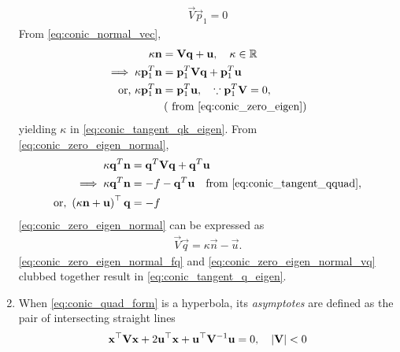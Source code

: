 \documentclass[journal,12pt,twocolumn]{IEEEtran}
\renewcommand\thesection{\arabic{section}}
\renewcommand\thesubsection{\thesection.\arabic{subsection}}
\begin{document}
\begin{enumerate}[label=\thesubsection.\arabic*.,ref=\thesubsection.\theenumi]
\begin{align}
\vec{V}\vec{p}_1 = 0
\label{eq:conic_zero_eigen}
\end{align}
From \eqref{eq:conic_normal_vec},
\begin{align}
\label{eq:conic_zero_eigen_normal}
\kappa \mathbf{n} &= \mathbf{V} \mathbf{q}+\mathbf{u}, \quad \kappa \in \mathbb{R}
\\
\implies \kappa \mathbf{p}_1^T\mathbf{n} &= \mathbf{p}_1^T\mathbf{V} \mathbf{q}+\mathbf{p}_1^T\mathbf{u}
\\
\text{or, } \kappa \mathbf{p}_1^T\mathbf{n} &= \mathbf{p}_1^T\mathbf{u},  \quad \because \mathbf{p}_1^T \mathbf{V} = 0, 
\\
	&\left(\text{ from } \eqref{eq:conic_zero_eigen}\right)
\end{align}
yielding $\kappa$ in \eqref{eq:conic_tangent_qk_eigen}. From \eqref{eq:conic_zero_eigen_normal},
\begin{align}
\kappa \mathbf{q}^T\mathbf{n} &= \mathbf{q}^T\mathbf{V} \mathbf{q}+\mathbf{q}^T\mathbf{u}
\\
\implies \kappa \mathbf{q}^T\mathbf{n} &= -f-\mathbf{q}^T\mathbf{u} \quad \text{from } \eqref{eq:conic_tangent_qquad},
\\
	\text{or, } \left(\kappa \mathbf{n}+\mathbf{u}\right)^{\top}\mathbf{q} &= -f
\label{eq:conic_zero_eigen_normal_fq}
\end{align}
\eqref{eq:conic_zero_eigen_normal} can be expressed as
\begin{align}
\label{eq:conic_zero_eigen_normal_vq}
\vec{V} \vec{q} = \kappa \vec{n} - \vec{u}.
\end{align}
\eqref{eq:conic_zero_eigen_normal_fq} and \eqref{eq:conic_zero_eigen_normal_vq} clubbed together result in \eqref{eq:conic_tangent_q_eigen}.
\item When \eqref{eq:conic_quad_form} is a hyperbola, its  {\em asymptotes}  are defined as the pair of intersecting straight lines 
  \begin{align}
  \label{eq:asymp_quad_form}
  \mathbf{x}^{\top}\mathbf{V}\mathbf{x}+2\mathbf{u}^{\top}\mathbf{x}+\mathbf{u}^{\top}\mathbf{V}^{-1}\mathbf{u}=0, \quad \left\vert\mathbf{V}\right\vert < 0
  \end{align}
  

\end{enumerate}
\end{document}

